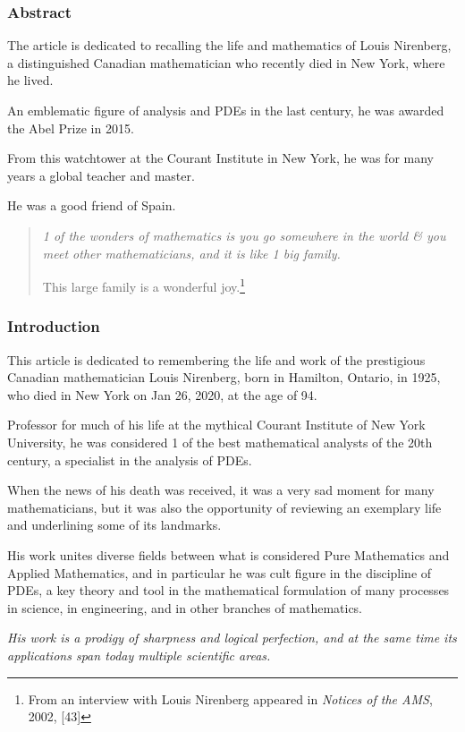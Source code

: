\documentclass{article}
\begin{document}
\subsubsection*{Abstract}
The article is dedicated to recalling the life and mathematics of Louis Nirenberg, a distinguished Canadian mathematician who recently died in New York, where he lived.

An emblematic figure of analysis and PDEs in the last century, he was awarded the Abel Prize in 2015.

From this watchtower at the Courant Institute in New York, he was for many years a global teacher and master.

He was a good friend of Spain.
\begin{quotation}\it
	1 of the wonders of mathematics is you go somewhere in the world \& you meet other mathematicians, and it is like 1 big family.
	
	This large family is a wonderful joy.\footnote{From an interview with Louis Nirenberg appeared in \textit{Notices of the AMS}, 2002, [43]}
\end{quotation}

\subsubsection{Introduction}
This article is dedicated to remembering the life and work of the prestigious Canadian mathematician Louis Nirenberg, born in Hamilton, Ontario, in 1925, who died in New York on Jan 26, 2020, at the age of 94.

Professor for much of his life at the mythical Courant Institute of New York University, he was considered 1 of the best mathematical analysts of the 20th century, a specialist in the analysis of PDEs.

%
When the news of his death was received, it was a very sad moment for many mathematicians, but it was also the opportunity of reviewing an exemplary life and underlining some of its landmarks.

His work unites diverse fields between what is considered Pure Mathematics and Applied Mathematics, and in particular he was cult figure in the discipline of PDEs, a key theory and tool in the mathematical formulation of many processes in science, in engineering, and in other branches of mathematics.

\textit{His work is a prodigy of sharpness and logical perfection, and at the same time its applications span today multiple scientific areas.}
\end{document}
